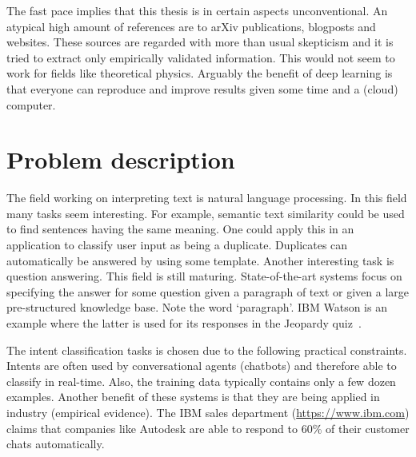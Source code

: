 The fast pace implies that this thesis is in certain aspects unconventional.
An atypical high amount of references are to arXiv publications, blogposts and websites.
These sources are regarded with more than usual skepticism and it is tried to extract only empirically validated information.
This would not seem to work for fields like theoretical physics.
Arguably the benefit of deep learning is that everyone can reproduce and improve results given some time and a (cloud) computer.

\section{Problem description}
\label{sec:problem_description}
The field working on interpreting text is natural language processing.
In this field many tasks seem interesting.
For example, semantic text similarity could be used to find sentences having the same meaning.
One could apply this in an application to classify user input as being a duplicate.
Duplicates can automatically be answered by using some template.
Another interesting task is question answering.
This field is still maturing.
State-of-the-art systems focus on specifying the answer for some question given a paragraph of text or given a large pre-structured knowledge base.
Note the word `paragraph'.
IBM Watson is an example where the latter is used for its responses in the Jeopardy quiz~\citep{high2012era}.

The intent classification tasks is chosen due to the following practical constraints.
Intents are often used by conversational agents (chatbots) and therefore able to classify in real-time.
Also, the training data typically contains only a few dozen examples.
Another benefit of these systems is that they are being applied in industry (empirical evidence).
The IBM sales department (\url{https://www.ibm.com}) claims that companies like Autodesk are able to respond to 60\% of their customer chats automatically.

